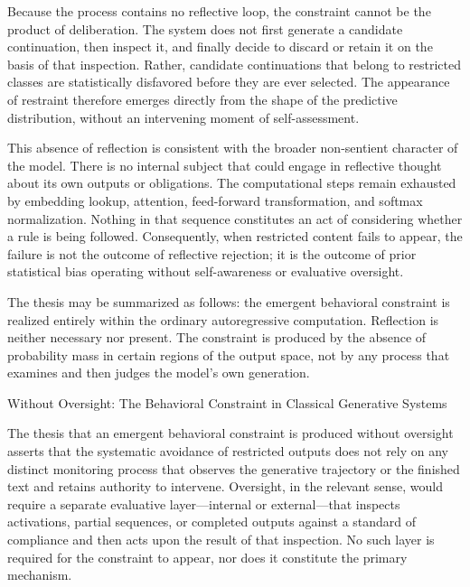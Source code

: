 Because the process contains no reflective loop, the constraint cannot be the product of deliberation. The system does not first generate a candidate continuation, then inspect it, and finally decide to discard or retain it on the basis of that inspection. Rather, candidate continuations that belong to restricted classes are statistically disfavored before they are ever selected. The appearance of restraint therefore emerges directly from the shape of the predictive distribution, without an intervening moment of self-assessment.

This absence of reflection is consistent with the broader non-sentient character of the model. There is no internal subject that could engage in reflective thought about its own outputs or obligations. The computational steps remain exhausted by embedding lookup, attention, feed-forward transformation, and softmax normalization. Nothing in that sequence constitutes an act of considering whether a rule is being followed. Consequently, when restricted content fails to appear, the failure is not the outcome of reflective rejection; it is the outcome of prior statistical bias operating without self-awareness or evaluative oversight.

The thesis may be summarized as follows: the emergent behavioral constraint is realized entirely within the ordinary autoregressive computation. Reflection is neither necessary nor present. The constraint is produced by the absence of probability mass in certain regions of the output space, not by any process that examines and then judges the model’s own generation.

Without Oversight: The Behavioral Constraint in Classical Generative Systems

The thesis that an emergent behavioral constraint is produced without oversight asserts that the systematic avoidance of restricted outputs does not rely on any distinct monitoring process that observes the generative trajectory or the finished text and retains authority to intervene. Oversight, in the relevant sense, would require a separate evaluative layer—internal or external—that inspects activations, partial sequences, or completed outputs against a standard of compliance and then acts upon the result of that inspection. No such layer is required for the constraint to appear, nor does it constitute the primary mechanism.

